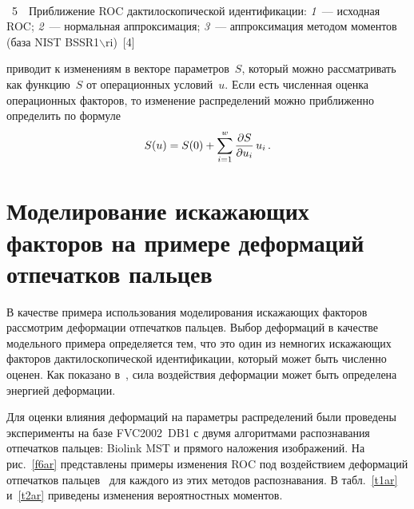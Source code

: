 \begin{multicols}{2}
\noindent
\begin{center} %
\vspace*{6pt}
\mbox{%
\epsfxsize=73.258mm
}
\end{center}
\vspace*{6pt}
{{\figurename~5}\ \ \small{Приближение ROC дактилоскопической идентификации: \textit{1}~--- исходная ROC;
\textit{2}~--- нормальная аппроксимация; \textit{3}~--- аппроксимация методом моментов (база NIST 
BSSR1$\backslash$ri)~[4]}}



\bigskip

\noindent
приводит к изменениям в векторе 
параметров~$S$, который можно рассматривать как функцию~$S$ от операционных 
условий~$u$. Если есть численная оценка операционных факторов, то изменение распределений 
можно приближенно определить по формуле
  \begin{equation}
  S(u) =S(0) +\sum\limits_{i=1}^w \displaystyle\frac{\displaystyle \partial S\mathstrut}{\displaystyle \partial u_i\mathstrut}\,u_i\,.
  \label{e5ar}
  \end{equation}

\section{Моделирование искажающих факторов на примере деформаций отпечатков пальцев}

  В качестве примера использования моделирования искажающих факторов рассмотрим 
деформации отпечатков пальцев. Выбор деформаций в качестве модельного примера 
определяется тем, что это один из немногих искажающих факторов дактилоскопической 
идентификации, который может быть численно оценен. Как показано в~\cite{10ar, 11ar}, сила 
воздействия деформации может быть определена энергией деформации. 
  
  Для оценки влияния деформаций на параметры распределений были проведены эксперименты 
на базе FVC2002~DB1 с двумя алгоритмами распознавания отпечатков пальцев: Biolink MST и 
прямого наложения изображений. На рис.~\ref{f6ar} представлены примеры изменения ROC под 
воздействием деформаций отпечатков пальцев~\cite{9ar, 10ar} для каждого из этих методов 
распознавания. В табл.~\ref{t1ar} и~\ref{t2ar} приведены изменения вероятностных моментов.


  
\begin{table*}\small
\begin{center}
\parbox{105mm}{

}
\end{center}
\end{table*}
\end{multicols}

